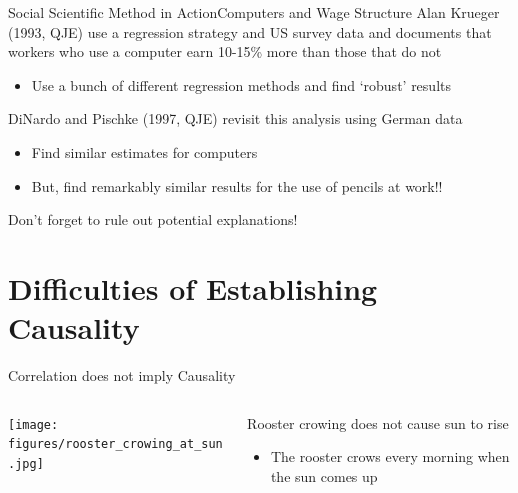 \documentclass[aspectratio=169,t,11pt,table]{beamer}
\begin{document}
\begin{frame}{Social Scientific Method in Action}{Computers and Wage Structure}
  Alan Krueger (1993, QJE) use a regression strategy and US survey data and documents that workers who use a computer earn 10-15\% more than those that do not
  \begin{itemize}
    \item Use a bunch of different regression methods and find `robust' results
  \end{itemize}

  \bigskip
  \pause
  DiNardo and Pischke (1997, QJE) revisit this analysis using German data
  \begin{itemize}
    \item Find similar estimates for computers
    
    \item But, find remarkably similar results for the use of pencils at work!!
  \end{itemize}

  \bigskip
  Don't forget to rule out potential explanations!
\end{frame}


%   
% 


\section{Difficulties of Establishing Causality}

\begin{frame}{Correlation does not imply Causality}
  \begin{columns}[T]
    \begin{column}{.6\textwidth}\vspace*{-\bigskipamount}
      \begin{center}
        \texttt{[image: figures/rooster\_crowing\_at\_sun.jpg]}
      \end{center}
    \end{column}
    \begin{column}{.4\textwidth}
      Rooster crowing does not cause sun to rise
      \begin{itemize}
        \item The rooster crows every morning when the sun comes up
      \end{itemize}
    \end{column}
  \end{columns}
\end{frame}
\end{document}

